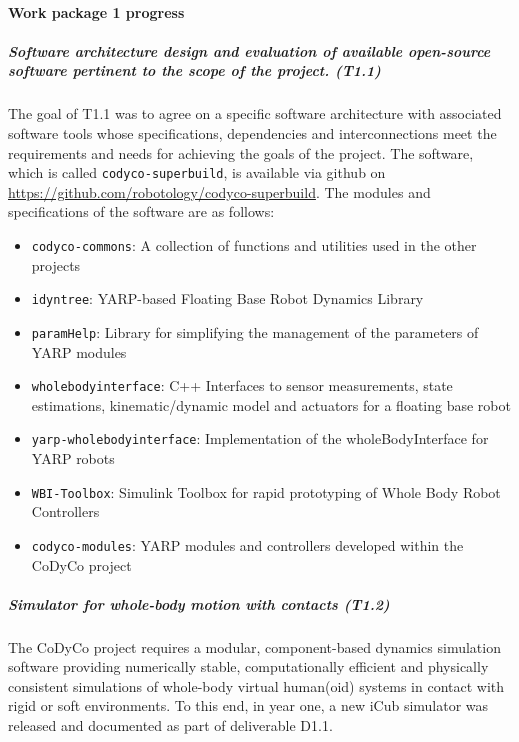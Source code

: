 

\paragraph{Work package 1 progress}

\subparagraph{Software architecture design and evaluation of available
  open-source software pertinent to the scope of the project. (T1.1)} 

The goal of T1.1 was to agree on a specific software architecture with
associated software tools whose specifications, dependencies and
interconnections meet the requirements and needs for achieving the goals of
the project.  The software, which is called \texttt{codyco-superbuild}, is
available via github on \url{https://github.com/robotology/codyco-superbuild}.
The modules and specifications of the software are as follows:

\begin{itemize}
\item \texttt{codyco-commons}: A collection of functions and utilities used in
  the other projects
\item \texttt{idyntree}: YARP-based Floating Base Robot Dynamics Library
\item \texttt{paramHelp}: Library for simplifying the management of the
  parameters of YARP modules
\item \texttt{wholebodyinterface}: C++ Interfaces to sensor measurements,
  state estimations, kinematic/dynamic model and actuators for a floating base
  robot
\item \texttt{yarp-wholebodyinterface}: Implementation of the
  wholeBodyInterface for YARP robots
\item \texttt{WBI-Toolbox}: Simulink Toolbox for rapid prototyping of Whole
  Body Robot Controllers
\item \texttt{codyco-modules}: YARP modules and controllers developed within
  the CoDyCo project
\end{itemize}


\subparagraph{Simulator for whole-body motion with contacts (T1.2)}

The CoDyCo project requires a modular, component-based dynamics simulation
software providing numerically stable, computationally efficient and
physically consistent simulations of whole-body virtual human(oid) systems in
contact with rigid or soft environments.  To this end, in year one, a new iCub
simulator was released and documented as part of deliverable D1.1.


